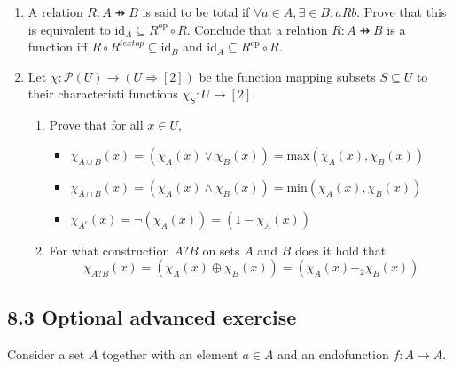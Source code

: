 \documentclass[10pt,\jkfside,a4paper]{article}
\begin{document}
\begin{enumerate}

\item A relation $R: A \pfun B$ is said to be total if $\forall a \in A, \exists  \in B: a R b$. Prove 
that this is equivalent to id$_A \subseteq R^{\text{op}} \circ R$. Conclude that a relation $R: A \pfun B$ 
is a function iff $R \circ R^{text{op}} \subseteq \text{id}_B$ and id$_A \subseteq R^{\text{op}} \circ R$.



\item Let $\chi: \mathcal{P}(U) \rightarrow (U \Rightarrow [2])$ be the function mapping subsets 
$S \subseteq U$ to their characteristi functions $\chi_S: U \rightarrow [2]$.

\begin{enumerate}

\item Prove that for all $x \in U$,

\begin{itemize}

\item $\chi_{A \cup B}(x) = (\chi_A(x) \vee \chi_B(x)) = \text{max}(\chi_A(x), \chi_B(x))$

\item $\chi_{A \cap B}(x) = (\chi_A(x) \wedge \chi_B(x)) = \text{min}(\chi_A(x), \chi_B(x))$

\item $\chi_{A^{\mathsf{c}}}(x) = ¬(\chi_A(x)) = (1 - \chi_A(x))$

\end{itemize}

\item For what construction $A ? B$ on sets $A$ and $B$ does it hold that 
\begin{equation}
\chi_{A ? B}(x) = (\chi_A(x) \oplus \chi_B(x)) = (\chi_A(x) +_2 \chi_B(x))
\end{equation}



\end{enumerate}

\end{enumerate}

\subsection*{8.3 Optional advanced exercise}

Consider a set $A$ together with an element $a \in A$ and an endofunction $f: A \rightarrow A$.
\end{document}

